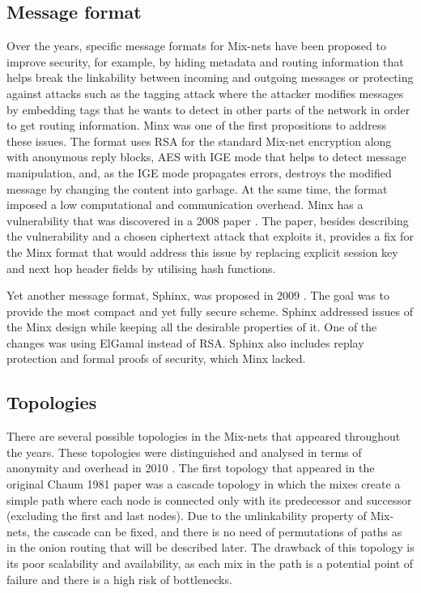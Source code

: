 \subsection{Message format}
Over the years, specific message formats for Mix-nets have been proposed to improve security, for example, by hiding metadata and routing information that helps break the linkability between incoming and outgoing messages or protecting against attacks such as the tagging attack where the attacker modifies messages by embedding tags that he wants to detect in other parts of the network in order to get routing information. Minx \cite{minx} was one of the first propositions to address these issues. The format uses RSA for the standard Mix-net encryption along with anonymous reply blocks, AES with IGE mode that helps to detect message manipulation, and, as the IGE mode propagates errors, destroys the modified message by changing the content into garbage. At the same time, the format imposed a low computational and communication overhead. Minx has a vulnerability that was discovered in a 2008 paper \cite{fix-minx}. The paper, besides describing the vulnerability and a chosen ciphertext attack that exploits it, provides a fix for the Minx format that would address this issue by replacing explicit session key and next hop header fields by utilising hash functions.

Yet another message format, Sphinx, was proposed in 2009 \cite{sphinx}. The goal was to provide the most compact and yet fully secure scheme. Sphinx addressed issues of the Minx design while keeping all the desirable properties of it. One of the changes was using ElGamal instead of RSA. Sphinx also includes replay protection and formal proofs of security, which Minx lacked.

\subsection{Topologies}
There are several possible topologies in the Mix-nets that appeared throughout the years. These topologies were distinguished and analysed in terms of anonymity and overhead in 2010 \cite{topology}. The first topology that appeared in the original Chaum 1981 paper was a cascade topology in which the mixes create a simple path where each node is connected only with its predecessor and successor (excluding the first and last nodes). Due to the unlinkability property of Mix-nets, the cascade can be fixed, and there is no need of permutations of paths as in the onion routing that will be described later. The drawback of this topology is its poor scalability and availability, as each mix in the path is a potential point of failure and there is a high risk of bottlenecks.

